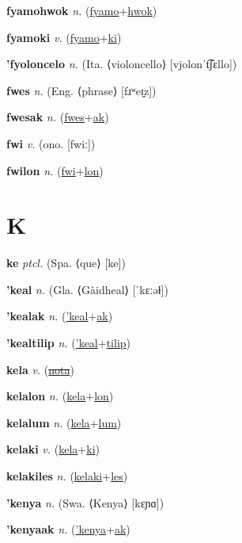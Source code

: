 \textbf{\hypertarget{fyamohwok}{fyamohwok}} \textit{n.} (\hyperlink{fyamo}{fyamo}+\allowbreak \hyperlink{hwok}{hwok})


\textbf{\hypertarget{fyamoki}{fyamoki}} \textit{v.} (\hyperlink{fyamo}{fyamo}+\allowbreak \hyperlink{ki}{ki})


\textbf{\hypertarget{'fyoloncelo}{'fyoloncelo}} \textit{n.} (Ita. ⟨violoncello⟩ [vjolonˈt͡ʃɛllo])


\textbf{\hypertarget{fwes}{fwes}} \textit{n.} (Eng. ⟨phrase⟩ [fɹʷeɪ̯z])


\textbf{\hypertarget{fwesak}{fwesak}} \textit{n.} (\hyperlink{fwes}{fwes}+\allowbreak \hyperlink{ak}{ak})


\textbf{\hypertarget{fwi}{fwi}} \textit{v.} (ono. [fwiː])


\textbf{\hypertarget{fwilon}{fwilon}} \textit{n.} (\hyperlink{fwi}{fwi}+\allowbreak \hyperlink{lon}{lon})


\section{K}

\textbf{\hypertarget{ke}{ke}} \textit{ptcl.} (Spa. ⟨que⟩ [ke])


\textbf{\hypertarget{'keal}{'keal}} \textit{n.} (Gla. ⟨Gàidheal⟩ [ˈkɛːəɫ])


\textbf{\hypertarget{'kealak}{'kealak}} \textit{n.} (\hyperlink{'keal}{'keal}+\allowbreak \hyperlink{ak}{ak})


\textbf{\hypertarget{'kealtilip}{'kealtilip}} \textit{n.} (\hyperlink{'keal}{'keal}+\allowbreak \hyperlink{tilip}{tilip})


\textbf{\hypertarget{kela}{kela}} \textit{v.} (\hyperlink{nota}{\sout{nota}})


\textbf{\hypertarget{kelalon}{kelalon}} \textit{n.} (\hyperlink{kela}{kela}+\allowbreak \hyperlink{lon}{lon})


\textbf{\hypertarget{kelalum}{kelalum}} \textit{n.} (\hyperlink{kela}{kela}+\allowbreak \hyperlink{lum}{lum})


\textbf{\hypertarget{kelaki}{kelaki}} \textit{v.} (\hyperlink{kela}{kela}+\allowbreak \hyperlink{ki}{ki})


\textbf{\hypertarget{kelakiles}{kelakiles}} \textit{n.} (\hyperlink{kelaki}{kelaki}+\allowbreak \hyperlink{les}{les})


\textbf{\hypertarget{'kenya}{'kenya}} \textit{n.} (Swa. ⟨Kenya⟩ [kɛɲɑ])


\textbf{\hypertarget{'kenyaak}{'kenyaak}} \textit{n.} (\hyperlink{'kenya}{'kenya}+\allowbreak \hyperlink{ak}{ak})


